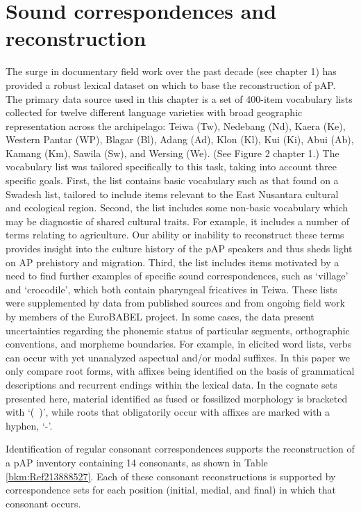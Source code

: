 \section{Sound correspondences and reconstruction}
\label{bkm:Ref214155962}The surge in documentary field work over the past decade (see chapter 1) has provided a robust lexical dataset on which to base the reconstruction of pAP. The primary data source used in this chapter is a set of 400-item vocabulary lists collected for twelve different language varieties with broad geographic representation across the archipelago: Teiwa (Tw), Nedebang (Nd), Kaera (Ke), Western Pantar (WP), Blagar (Bl), Adang (Ad), Klon (Kl), Kui (Ki), Abui (Ab), Kamang (Km), Sawila (Sw), and Wersing (We). (See Figure 2 chapter 1.) The vocabulary list was tailored specifically to this task, taking into account three specific goals. First, the list contains basic vocabulary such as that found on a Swadesh list, tailored to include items relevant to the East Nusantara cultural and ecological region. Second, the list includes some non-basic vocabulary which may be diagnostic of shared cultural traits. For example, it includes a number of terms relating to agriculture. Our ability or 
inability to reconstruct these terms provides insight into the culture history of the pAP speakers and thus sheds light on AP prehistory and migration. Third, the list includes items motivated by a need to find further examples of specific sound correspondences, such as `village' and `crocodile', which both contain pharyngeal fricatives in Teiwa. These lists were supplemented by data from published sources and from ongoing field work by members of the EuroBABEL project. In some cases, the data present uncertainties regarding the phonemic status of particular segments, orthographic conventions, and morpheme boundaries. For example, in elicited word lists, verbs can occur with yet unanalyzed aspectual and/or modal suffixes. In this paper we only compare root forms, with affixes being identified on the basis of grammatical descriptions and recurrent endings within the lexical data. In the cognate sets presented here, material identified as fused or fossilized morphology is bracketed with `(~)', while roots that 
obligatorily occur with affixes are marked with a hyphen, `-'. 

Identification of regular consonant correspondences supports the reconstruction of a pAP inventory containing 14 consonants, as shown in Table \ref{bkm:Ref213888527}. Each of these consonant reconstructions is supported by correspondence sets for each position (initial, medial, and final) in which that consonant occurs. 



